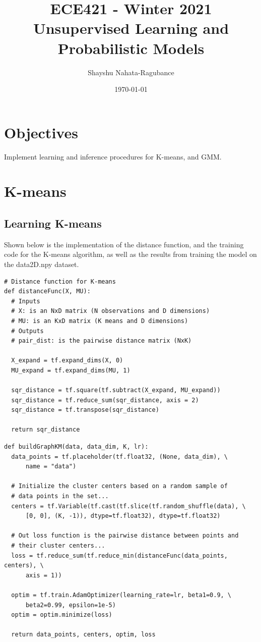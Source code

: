 \documentclass[12pt]{article}
\title{ECE421 - Winter 2021 \\ Unsupervised Learning and Probabilistic Models}
\author{Shayshu Nahata-Ragubance}
\date{\today}
\begin{document}
\maketitle

\section{Objectives}
Implement learning and inference procedures for K-means, and GMM. 

\section{K-means}
\subsection{Learning K-means}
Shown below is the implementation of the distance function, and the training code
for the K-means algorithm,  as well as the results from training the model
on the data2D.npy dataset.

\begin{verbatim}
# Distance function for K-means
def distanceFunc(X, MU):
  # Inputs
  # X: is an NxD matrix (N observations and D dimensions)
  # MU: is an KxD matrix (K means and D dimensions)
  # Outputs
  # pair_dist: is the pairwise distance matrix (NxK)

  X_expand = tf.expand_dims(X, 0)
  MU_expand = tf.expand_dims(MU, 1)

  sqr_distance = tf.square(tf.subtract(X_expand, MU_expand))
  sqr_distance = tf.reduce_sum(sqr_distance, axis = 2)
  sqr_distance = tf.transpose(sqr_distance)

  return sqr_distance
\end{verbatim}

\begin{verbatim}
def buildGraphKM(data, data_dim, K, lr):
  data_points = tf.placeholder(tf.float32, (None, data_dim), \
      name = "data")

  # Initialize the cluster centers based on a random sample of
  # data points in the set...
  centers = tf.Variable(tf.cast(tf.slice(tf.random_shuffle(data), \
      [0, 0], (K, -1)), dtype=tf.float32), dtype=tf.float32)

  # Out loss function is the pairwise distance between points and 
  # their cluster centers...
  loss = tf.reduce_sum(tf.reduce_min(distanceFunc(data_points, centers), \ 
      axis = 1))

  optim = tf.train.AdamOptimizer(learning_rate=lr, beta1=0.9, \ 
      beta2=0.99, epsilon=1e-5)
  optim = optim.minimize(loss)

  return data_points, centers, optim, loss
\end{verbatim}
\end{document}
